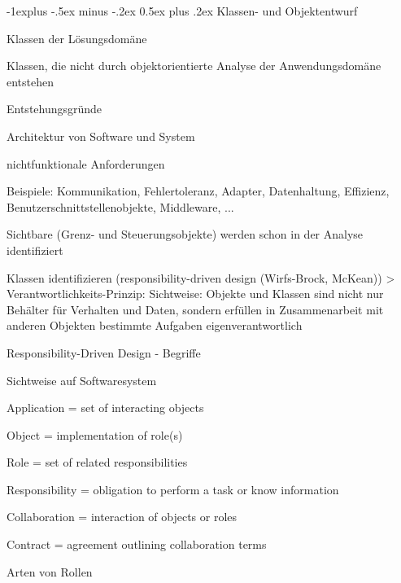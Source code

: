 \documentclass[a4paper]{article}
\makeatletter
\renewcommand{\subsection}{\@startsection{subsection}{2}{0mm}%
                                {-1explus -.5ex minus -.2ex}%
                                {0.5ex plus .2ex}%
                                {\normalfont\normalsize\bfseries}}
\makeatother
\begin{document}
\begin{multicols}{3}
  \subsection{Klassen- und Objektentwurf}
  \begin{itemize*}
    \item Klassen der Lösungsdomäne
          \begin{itemize*}
            \item Klassen, die nicht durch objektorientierte Analyse der Anwendungsdomäne entstehen
          \end{itemize*}
    \item Entstehungsgründe
          \begin{itemize*}
            \item Architektur von Software und System
            \item nichtfunktionale Anforderungen
            \item Beispiele: Kommunikation, Fehlertoleranz, Adapter, Datenhaltung, Effizienz, Benutzerschnittstellenobjekte, Middleware, ...
            \item Sichtbare (Grenz- und Steuerungsobjekte) werden schon in der Analyse identifiziert
          \end{itemize*}
  \end{itemize*}

  Klassen identifizieren (responsibility-driven design (Wirfs-Brock, McKean))
  > Verantwortlichkeits-Prinzip: Sichtweise: Objekte und Klassen sind nicht nur Behälter für Verhalten und Daten, sondern erfüllen in Zusammenarbeit mit anderen Objekten bestimmte Aufgaben eigenverantwortlich

  Responsibility-Driven Design - Begriffe
  \begin{itemize*}
    \item Sichtweise auf Softwaresystem
    \item Application = set of interacting objects
    \item Object = implementation of role(s)
    \item Role = set of related responsibilities
    \item Responsibility = obligation to perform a task or know information
    \item Collaboration = interaction of objects or roles
    \item Contract = agreement outlining collaboration terms
  \end{itemize*}

  Arten von Rollen


\end{multicols}
\end{document}
